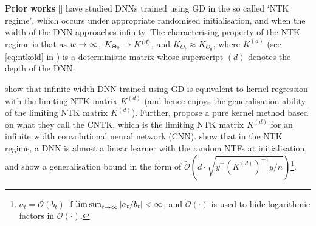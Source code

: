 \textbf{Prior works} [] have studied DNNs trained using GD in the so called `NTK regime', which occurs under appropriate randomised initialisation, and when the width of the DNN approaches infinity. The characterising property of the NTK regime is that as $w\rightarrow\infty$, $K_{\Theta_0}\rightarrow K^{(d)}$, and $K_{\Theta_t}\approx K_{\Theta_0}$, where $K^{(d)}$ (see \eqref{eq:ntkold} in ) is a deterministic matrix whose superscript $(d)$ denotes the depth of the DNN. 
\begin{comment}
The $K^{(d)}$ matrix is computed by the recursion in \eqref{eq:ntkold}.
\begin{align}\label{eq:ntkold}
&\tilde{K}^{(1)}(s,s')=\Sigma^{(1)}(s,s')=\Sigma(s,s'), M^{(l)}_{ss'}=\left[\begin{matrix}\Sigma^{(l)}(s,s) & \Sigma^{(l)}(s,s')\\ \Sigma^{(l)}(s',s) & \Sigma^{(l)}(s',s')\end{matrix}\right]\in \R^2,\\
&\Sigma^{(l+1)}(s,s')= 2\cdot\mathbb{E}_{(q,q')\sim N(0,M_{ss'}^{(l)})} \left[\chi(q)\chi(q')\right], \hat{\Sigma}^{(l+1)}(s,s')= 2\cdot\mathbb{E}_{(q,q')\sim N(0,M_{ss'}^{(l)})}\left[\partial\chi(q)\partial{\chi}(q')\right],\nn\\
&\tilde{K}^{(l+1)}=\tilde{K}^{(l)}\odot \hat{\Sigma}^{(l+1)}+\Sigma^{(l+1)}, K^{(d)}=\left(\tilde{K}^{(d)}+\Sigma^{(d)}\right)/2
\end{align}
where $s,s'\in[n]$ are two input examples in the dataset, $\Sigma$ is the data Gram matrix, $\partial{\chi}$ stands for the derivative of the activation function with respect to the pre-activation input, $N(0,M)$ stands for the mean-zero Gaussian distribution with co-variance matrix $M$.
\end{comment}
\cite{arora2019exact} show that infinite width DNN trained using GD is equivalent to kernel regression with the limiting NTK matrix $K^{(d)}$ (and hence enjoys the generalisation ability of the limiting NTK matrix $K^{(d)}$). Further, \cite{arora2019exact} propose a pure kernel method based on what they call the CNTK, which is the limiting NTK matrix $K^{(d)}$ for an infinite width convolutional neural network (CNN). \cite{cao2019generalization} show that in the NTK regime, a DNN is almost a linear learner with the random NTFs at initialisation, and show a generalisation bound in the form of $\tilde{\mathcal{O}}\left(d\cdot\sqrt{y^\top {\left(K^{(d)}\right)}^{-1} y/n}\right)$\footnote{$a_t=\mathcal{O}(b_t)$ if $\lim\sup_{t\rightarrow\infty}|a_t/b_t|<\infty$, and $\tilde{\mathcal{O}}(\cdot)$ is used to hide logarithmic factors in $\mathcal{O}(\cdot)$.}. 

